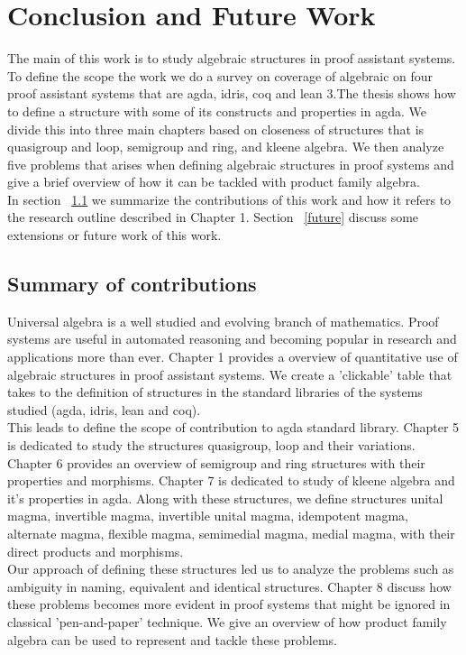 \chapter{Conclusion and Future Work}
The main of this work is to study algebraic structures in proof assistant systems. To define the scope the work we do a survey on coverage of algebraic on four proof assistant systems that are agda, idris, coq and lean 3.The thesis shows how to define a structure with some of its constructs and properties in agda. We divide this into three main chapters based on closeness of structures that is quasigroup and loop, semigroup and ring, and kleene algebra. We then analyze five problems that arises when defining algebraic structures in proof systems and give a brief overview of how it can be tackled with product family algebra. \\

In section ~\ref{contribution} we summarize the contributions of this work and how it refers to the research outline described in Chapter 1. Section ~\ref{future} discuss some extensions or future work of this work. 

\section{Summary of contributions}
\label{contribution}
Universal algebra is a well studied and evolving branch of mathematics. Proof systems are useful in automated reasoning and becoming popular in research and applications more than ever. Chapter 1 provides a overview of quantitative use of algebraic structures in proof assistant systems. We create a 'clickable' table that takes to the definition of structures in the standard libraries of the systems studied (agda, idris, lean and coq). \\

This leads to define the scope of contribution to agda standard library. Chapter 5 is dedicated to study the structures quasigroup, loop and their variations. Chapter 6 provides an overview of semigroup and ring structures with their properties and morphisms. Chapter 7 is dedicated to study of kleene algebra and it's properties in agda. Along with these structures, we define structures unital magma, invertible magma, invertible unital magma, idempotent magma, alternate magma, flexible magma, semimedial magma, medial magma, with their direct products and morphisms.\\

Our approach of defining these structures led us to analyze the problems such as ambiguity in naming, equivalent and identical structures. Chapter 8 discuss how these problems becomes more evident in proof systems that might be ignored in classical 'pen-and-paper' technique. We give an overview of how product family algebra can be used to represent and tackle these problems.

